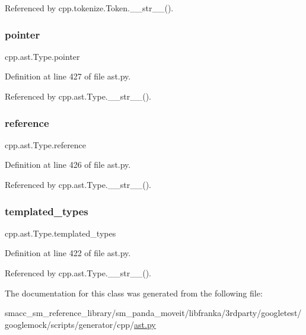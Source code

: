 Referenced by cpp.\+tokenize.\+Token.\+\_\+\+\_\+str\+\_\+\+\_\+().

\mbox{\label{classcpp_1_1ast_1_1Type_a37234bb68915c93894cbc8e366c1eaad}} 
\subsubsection{\texorpdfstring{pointer}{pointer}}
{\footnotesize\ttfamily cpp.\+ast.\+Type.\+pointer}



Definition at line 427 of file ast.\+py.



Referenced by cpp.\+ast.\+Type.\+\_\+\+\_\+str\+\_\+\+\_\+().

\mbox{\label{classcpp_1_1ast_1_1Type_a8d2cddd631397c3bf86198cc420d584d}} 
\subsubsection{\texorpdfstring{reference}{reference}}
{\footnotesize\ttfamily cpp.\+ast.\+Type.\+reference}



Definition at line 426 of file ast.\+py.



Referenced by cpp.\+ast.\+Type.\+\_\+\+\_\+str\+\_\+\+\_\+().

\mbox{\label{classcpp_1_1ast_1_1Type_a7c38fcafa00dae6ee22bab783086a1a7}} 
\subsubsection{\texorpdfstring{templated\+\_\+types}{templated\_types}}
{\footnotesize\ttfamily cpp.\+ast.\+Type.\+templated\+\_\+types}



Definition at line 422 of file ast.\+py.



Referenced by cpp.\+ast.\+Type.\+\_\+\+\_\+str\+\_\+\+\_\+().



The documentation for this class was generated from the following file\+:\begin{DoxyCompactItemize}
\item 
smacc\+\_\+sm\+\_\+reference\+\_\+library/sm\+\_\+panda\+\_\+moveit/libfranka/3rdparty/googletest/googlemock/scripts/generator/cpp/\hyperlink{ast_8py}{ast.\+py}\end{DoxyCompactItemize}
